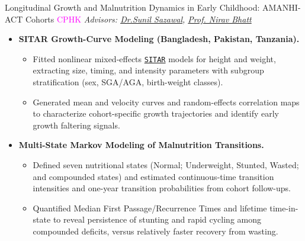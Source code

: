 \begin{projects}

\project
  {Longitudinal Growth and Malnutrition Dynamics in Early Childhood: AMANHI-ACT Cohorts}
  {\textcolor{magenta}{CPHK}}
  {\textit{Advisors: \href{https://publichealth.jhu.edu/faculty/613/sunil-sazawal}{Dr.Sunil Sazawal}, \href{https://www.iitmz.ac.in/schools/engineering-and-science/faculty/dr-nirav-bhatt}{Prof. Nirav Bhatt}}}
  {\begin{itemize}\setlength\itemsep{0.5em}
      \item \textbf{SITAR Growth-Curve Modeling (Bangladesh, Pakistan, Tanzania).}
        \begin{itemize}\setlength\itemsep{0.3em}
    \item Fitted nonlinear mixed-effects \href{https://cran.r-project.org/web/packages/sitar/index.html}{\texttt{SITAR}} models for height and weight, extracting size, timing, and intensity parameters with subgroup stratification (sex, SGA/AGA, birth-weight classes).
    \item Generated mean and velocity curves and random-effects correlation maps to characterize cohort-specific growth trajectories and identify early growth faltering signals.
  \end{itemize}

      \item   \textbf{Multi-State Markov Modeling of Malnutrition Transitions.}
       \begin{itemize}\setlength\itemsep{0.3em}
    \item Defined seven nutritional states (Normal; Underweight, Stunted, Wasted; and compounded states) and estimated continuous-time transition intensities and one-year transition probabilities from cohort follow-ups.
    \item Quantified Median First Passage/Recurrence Times and lifetime time-in-state to reveal persistence of stunting and rapid cycling among compounded deficits, versus relatively faster recovery from wasting.
  \end{itemize}

  \end{itemize}}


\end{projects}
